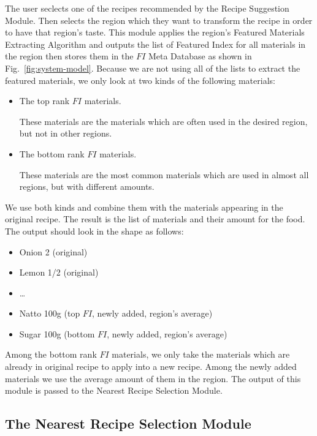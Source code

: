 The user seclects one of the recipes recommended by the Recipe Suggestion Module. Then selects the region which they want to transform the recipe in order to have that region's taste. This module applies the region's Featured Materials Extracting Algorithm and outputs the list of Featured Index for all materials in the region then stores them in the $FI$ Meta Database as shown in Fig.~\ref{fig:system-model}. Because we are not using all of the lists to extract the featured materials, we only look at two kinds of the following materials: 

\begin{itemize}
\item The top rank $FI$ materials.

These materials are the materials which are often used in the desired region, but not in other regions. 
\item The bottom rank $FI$ materials.

These materials are the most common materials which are used in almost all regions, but with different amounts. 
	 
\end{itemize}

We use both kinds and combine them with the materials appearing in the original recipe. The result is the list of materials and their amount for the food. The output should look in the shape as follows:

\begin{itemize}
\item Onion 2     (original)
\item Lemon 1/2   (original)
\item \ldots
\item Natto 100g  (top $FI$, newly added, region's average)
\item Sugar 100g  (bottom $FI$, newly added, region's average)
\end{itemize}

Among the bottom rank $FI$ materials, we only take the materials which are already in original recipe to apply into a new recipe. Among the newly added materials we use the average amount of them in the region. The output of this module is passed to the Nearest Recipe Selection Module. 
 
\subsection{The Nearest Recipe Selection Module} 

